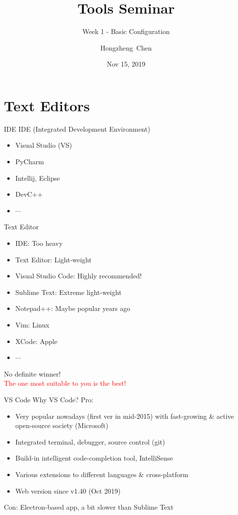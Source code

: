 \documentclass{../TexTemplate/myslide}
\title[ToolsSeminar]{Tools Seminar}
\subtitle{Week 1 - Basic Configuration}
\author[chhzh123]{Hongzheng~Chen}
\date[Nov 15, 2019]{Nov 15, 2019}
\begin{document}
\begin{frame}
\titlepage
\end{frame}

\begin{frame}
\tableofcontents
\end{frame}

\section{Text Editors}
\begin{frame}
\sectionpage
\end{frame}

\begin{frame}{IDE}
IDE (Integrated Development Environment)
\begin{itemize}
	\item Visual Studio (VS)
	\item PyCharm
	\item Intellij, Eclipse
	\item DevC++
	\item $\cdots$
\end{itemize}
\end{frame}

\begin{frame}{Text Editor}
\begin{itemize}
	\item [\xmark] IDE: Too heavy
	\item [\cmark] Text Editor: Light-weight
\end{itemize}
\begin{itemize}
	\item Visual Studio Code: Highly recommended!
	\item Sublime Text: Extreme light-weight
	\item Notepad++: Maybe popular years ago
	\item Vim: Linux
	\item XCode: Apple
	\item $\cdots$
\end{itemize}
\pause
No definite winner!\\
\textcolor{red}{The one most suitable to you is the best!}
\end{frame}

\begin{frame}{VS Code}
Why VS Code? Pro:
\begin{itemize}
	\item Very popular nowadays (first ver in mid-2015) with fast-growing \& active open-source society (Microsoft)
	\item Integrated terminal, debugger, source control (git)
	\item Build-in intelligent code-completion tool, IntelliSense
	\item Various extensions to different languages \& cross-platform
	\item Web version since v1.40 (Oct 2019)
\end{itemize}
Con: Electron-based app, a bit slower than Sublime Text
\end{frame}
\end{document}

